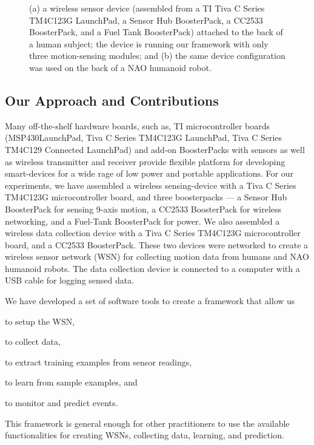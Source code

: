 \documentclass{IEEEtran}
\begin{document}
\begin{figure}[htb]
\centering
{}
\qquad
{} 
\caption{(a) a wireless sensor device (assembled from a TI Tiva C Series  TM4C123G LaunchPad, a Sensor Hub BoosterPack, a CC2533 BoosterPack, and a Fuel Tank BoosterPack) attached to the back of a human subject; the device is running our framework  with only three motion-sensing modules; and (b) the 
same device configuration was used on the back of a NAO humanoid robot.}
 \label{fig:deviceWithSubjects}
\end{figure}

\subsection{Our Approach and Contributions}

Many off-the-shelf hardware boards, such as, TI microcontroller boards (MSP430{\texttrademark}LaunchPad, Tiva{\texttrademark} C Series 
TM4C123G LaunchPad, Tiva C Series TM4C129 Connected LaunchPad) and add-on  BoosterPacks   with sensors as well as  wireless transmitter and receiver  provide flexible platform for 
developing smart-devices for a wide rage of low power and portable applications. For our experiments, 
we have assembled a wireless sensing-device with a Tiva C Series TM4C123G microcontroller board, and three 
boosterpacks --- a
Sensor Hub BoosterPack  for sensing 9-axis motion,  a CC2533  BoosterPack for wireless 
networking, and a Fuel-Tank BoosterPack for power. We also assembled a wireless data collection device with a Tiva C Series TM4C123G microcontroller board, and a  CC2533  BoosterPack. These two devices were networked to create a wireless sensor network (WSN) for 
collecting motion data from  humans and NAO humanoid robots. The data collection device is connected to a computer with a USB cable for logging sensed data.   

We have developed a set of software tools to create a framework that allow us
\begin{inparaenum}[($i$)] \item  to setup the WSN, \item to collect data, \item to extract training examples from sensor readings, \item to learn from sample examples, and \item 
to monitor and predict events. \end{inparaenum} This framework is general enough for other practitioners to use the
available functionalities for creating WSNs, collecting data, learning, and prediction.
\end{document}
